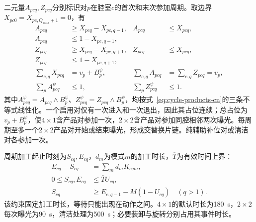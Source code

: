 \documentclass[final,5p,times,twocolumn]{elsarticle}
\begin{document}
二元量$A_{pcq},Z_{pcq}$分别标识对$p$在腔室$c$的首次和末次参加周期。取边界$X_{pc0}=X_{pc,Q_{\max}+1}=0$，有
\begin{equation}
\begin{aligned}
A_{pcq}&\ge X_{pcq}-X_{pc,q-1}, &A_{pcq}&\le X_{pcq},\\
A_{pcq}&\le1-X_{pc,q-1},\\
Z_{pcq}&\ge X_{pcq}-X_{pc,q+1}, &Z_{pcq}&\le X_{pcq},\\
Z_{pcq}&\le1-X_{pc,q+1},\\
\sum_{c,q}X_{pcq}&=v_p+B_p^{\psi}, &\sum_{c,q}A_{pcq}&=\sum_{c,q}Z_{pcq}=v_p,\\
\sum_pA^{\psi}_{pcq}&\le1, &\sum_pZ^{\psi}_{pcq}&\le1.
\end{aligned}
\label{eq:cycle-exposures-cn}
\end{equation}
其中$A^{\psi}_{pcq}=A_{pcq}\land B_p^{\psi}$、$Z^{\psi}_{pcq}=Z_{pcq}\land B_p^{\psi}$，均按式~\eqref{eq:cycle-products-cn}的三条不等式线性化。一个启用对仅有一次进入和一次退出，因此其占位连续；总占位为$v_p+B_p^{\psi}$，使$4\times1$含产品对参加一次，$2\times2$含产品对参加同腔相邻两次曝光。每周期至多一个$2\times2$产品对开始或结束曝光，形成交替换片链。纯辅助补位对或清洁对各参加一次。

周期加工起止时刻为$S_{cq},E_{cq}$，$d_m$为模式$m$的加工时长，$\overline T$为有效时间上界：
\begin{equation}
\begin{aligned}
E_{cq}-S_{cq}&=\sum_m d_mK_{cqm},\\
0\le S_{cq},E_{cq}&\le\overline T U_{cq},\\
S_{cq}&\ge E_{c,q-1}-M(1-U_{cq})\quad(q>1).
\end{aligned}
\label{eq:cycle-time-cn}
\end{equation}
该约束固定加工时长，等待只能出现在动作之间。$4\times1$的默认时长为180~s，$2\times2$每次曝光为90~s，清洁处理为500~s；必要装卸与旋转分别占用其事件时长。
\end{document}
